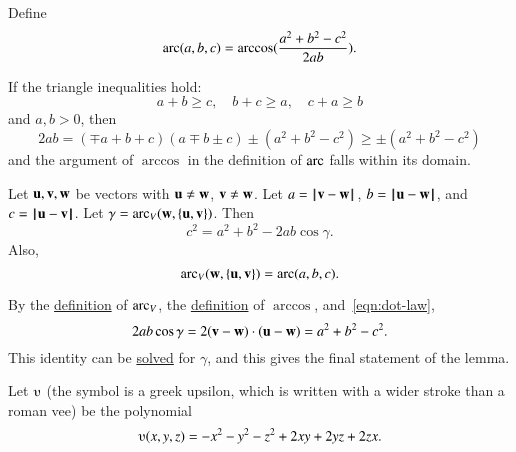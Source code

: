 \begin{definition}[arc]\label{def:arc}
Define
\begin{displaymath}\operatorname{arc}(a,b,c) = \arccos(\frac{a^2 + b^2 - c^2}{2 a
    b}).\end{displaymath}
%
\end{definition}

If the triangle inequalities hold:
\begin{displaymath}
a + b \ge c,\quad b + c \ge a, \quad c+a \ge b
\end{displaymath}
and $a,b >0$, then
\begin{displaymath}
  2 a b = (\mp a+b+c)(a \mp b \pm c) \pm (a^2 + b^2 - c^2) 
\ge \pm  (a^2 + b^2 - c^2)
\end{displaymath}
and the argument of $\arccos$ in the definition of $\operatorname{arc}$ falls within
its domain.

\begin{lemma}\label{lemma:loc}
Let ${\mathbf u},{\mathbf v},{\mathbf w}$ be vectors with ${\mathbf u}\ne {\mathbf w}$, ${\mathbf v}\ne {\mathbf w}$.  Let $a
= \norm{\v }{ \w}$, $b = \norm{\u }{ \w}$, and $c = \norm{\u }{ \v}$.
Let $\gamma=\operatorname{arc}_V({\mathbf w},\{{\mathbf u},{\mathbf v}\})$.    Then
\begin{displaymath}c^2 = a^2 + b^2 - 2 a b \cos\gamma.\end{displaymath}
Also,
\begin{displaymath}
\operatorname{arc}_V({\mathbf w},\{{\mathbf u},{\mathbf v}\})= \operatorname{arc}(a,b,c).
\end{displaymath}

\end{lemma}
%
%
%
%
\begin{proved}
By the \hyperref[def:angle]{definition} of $\operatorname{arc}_V$, the
\hyperref[def:arccos]{definition} of $\arccos$, and~\eqref{eqn:dot-law},
\begin{displaymath}
2 a b \cos \gamma = 2 ({\mathbf v} - {\mathbf w})\cdot ({\mathbf u} - {\mathbf w}) = a^2 + b^2 - c^2.
\end{displaymath}
This identity can be \hyperref[def:arccos]{solved} for $\gamma$, and
this gives the final statement of the lemma.  \swallowed\end{proved}


\begin{definition}[$\ups$]\label{def:ups}
Let $\ups$ (the symbol is a greek upsilon, which is written with a
wider stroke than a roman vee) be the polynomial
\begin{displaymath}\ups(x,y,z) = -x^2 - y^2 - z^2 + 2 x y + 2 y z + 2
  z x.\end{displaymath}
%
\end{definition}



